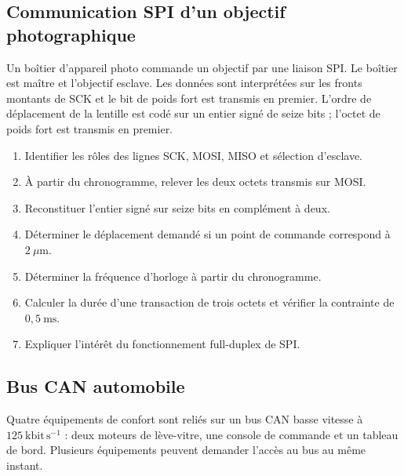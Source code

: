 \subsection{Communication SPI d'un objectif photographique}

Un boîtier d'appareil photo commande un objectif par une liaison SPI. Le boîtier est maître et l'objectif esclave. Les données sont interprétées sur les fronts montants de SCK et le bit de poids fort est transmis en premier. L'ordre de déplacement de la lentille est codé sur un entier signé de seize bits ; l'octet de poids fort est transmis en premier.


\begin{enumerate}
  \item Identifier les rôles des lignes SCK, MOSI, MISO et sélection d'esclave.
  \item À partir du chronogramme, relever les deux octets transmis sur MOSI.
  \item Reconstituer l'entier signé sur seize bits en complément à deux.
  \item Déterminer le déplacement demandé si un point de commande correspond à $2\ \mu\mathrm m$.
  \item Déterminer la fréquence d'horloge à partir du chronogramme.
  \item Calculer la durée d'une transaction de trois octets et vérifier la contrainte de $0{,}5\ \mathrm{ms}$.
  \item Expliquer l'intérêt du fonctionnement full-duplex de SPI.
\end{enumerate}


\subsection{Bus CAN automobile}

Quatre équipements de confort sont reliés sur un bus CAN basse vitesse à $125\ \mathrm{kbit\,s^{-1}}$ : deux moteurs de lève-vitre, une console de commande et un tableau de bord. Plusieurs équipements peuvent demander l'accès au bus au même instant.


